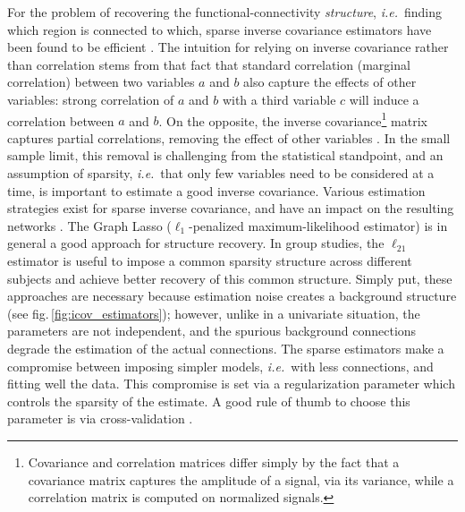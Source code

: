 \documentclass[5p]{elsarticle}
\begin{document}
For the problem of recovering the functional-connectivity
\emph{structure}, \emph{i.e.}\ finding which region is connected to
which, sparse inverse covariance estimators have been found to be
efficient \cite{varoquaux2010c, smith2011}. The intuition for relying on
inverse covariance rather than correlation stems from that fact that
standard correlation (marginal correlation) between two variables $a$ and
$b$ also capture the effects of other variables: strong correlation of
$a$ and $b$ with a third variable $c$ will induce a correlation between
$a$ and $b$. On the opposite, the inverse covariance\footnote{Covariance
and correlation matrices differ simply by the fact that a covariance
matrix captures the amplitude of a signal, via its variance, while a
correlation matrix is computed on normalized signals.}
matrix captures
partial correlations, removing the effect of other variables
\cite{marrelec2006a}. In the small sample limit, this removal is
challenging from the statistical standpoint, and an assumption of sparsity,
\emph{i.e.}\ that only few variables need to be considered at a time, is
important to estimate a good inverse covariance. Various estimation
strategies exist for sparse inverse covariance, and have an impact on the
resulting networks \cite{varoquaux2012,varoquaux2010c}. The
Graph Lasso ($\ell_1$-penalized maximum-likelihood estimator)
\cite{friedman2008} is in general a good approach for structure recovery. In group studies,
the $\ell_{21}$ estimator \cite{varoquaux2010c,honorio2012} is useful to
impose a common sparsity structure across different subjects and achieve
better recovery of this common structure. Simply put, these approaches
are necessary because estimation noise creates a background structure
(see fig.\,\ref{fig:icov_estimators}); however, unlike in a univariate situation, the
parameters are not independent, and the spurious background connections
degrade the estimation of the actual connections. The sparse estimators
make a compromise between imposing simpler models, \emph{i.e.}\ with less
connections, and fitting well the data. This compromise is set via a
regularization parameter which controls the sparsity of the estimate. A
good rule of thumb to choose this parameter is via cross-validation
\cite{varoquaux2010c}.

\end{document}
